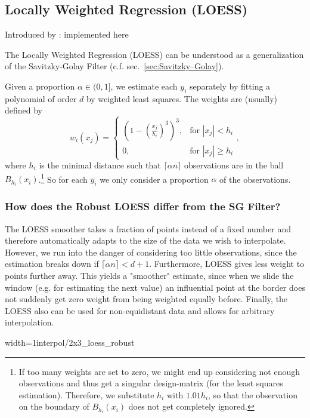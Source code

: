 \subsection{Locally Weighted Regression (LOESS)}
\label{sec:loess}
Introduced by : \cite{clevelandRobustLocallyWeighted1979}
implemented here \cite{cappellariATLAS3DProjectXX2013}

The Locally Weighted Regression (LOESS) can be understood as a generalization of the Savitzky-Golay Filter (c.f. sec.~\ref{sec:Savitzky–Golay}).

Given a proportion $\alpha \in (0,1]$, we estimate each $y_i$ separately by fitting a polynomial of order $d$ by weighted least squares. The weights are (usually) defined by
$$w_i(x_j)=\begin{cases}
		\left(1-\left(\frac{x_j}{h_i}\right)^{3}\right)^{3}, & \text{for } |x_j|<h_i           \\
		0,                                                   & \text{for } |x_j| \geqslant h_i
	\end{cases} ,$$
where $h_i$ is the minimal distance such that $\lceil \alpha n\rceil$ observations are in the ball $B_{h_i}(x_i)$.\footnote{If too many weights are set to zero, we might end up considering not enough observations and thus get a singular design-matrix (for the least squares estimation). Therefore, we substitute $h_i$ with $1.01 h_i$, so that the observation on the boundary of $B_{h_i}(x_i)$ does not get completely ignored.} So for each $y_i$ we only consider a proportion $\alpha$ of the observations.

\subsubsection{How does the Robust LOESS differ from the SG Filter?}
The LOESS smoother takes a fraction of points instead of a fixed number and therefore automatically adapts to the size of the data we wish to interpolate. However, we run into the danger of considering too little observations, since the estimation breaks down if $\lceil \alpha n\rceil < d+1$.
Furthermore, LOESS gives less weight to points further away. This yields a "smoother" estimate, since when we slide the window (e.g. for estimating the next value) an influential point at the border does not suddenly get zero weight from being weighted equally before.
Finally, the LOESS also can be used for non-equidistant data and allows for arbitrary interpolation.

\begin{my_figure}[h]{width=1\textwidth}{interpol/2x3_loess_robust}
	\caption{The LOESS smoother \RobItPlot}
	\label{fig:interpol/2x3_loess_robust}
\end{my_figure}

